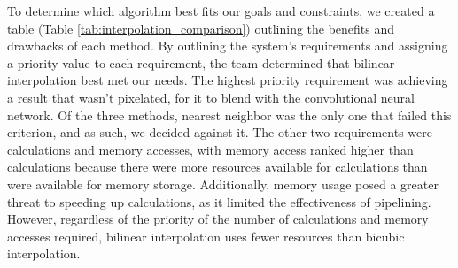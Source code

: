\documentclass{article}
\begin{document}
    \begin{table}[h]
    \centering
    \caption{A comparison between three upscaling methods based on three requirements relevant to the high-level upscaling structure.}
    \label{tab:interpolation_comparison}
    \end{table}


    \par To determine which algorithm best fits our goals and constraints, we created a table (Table \ref{tab:interpolation_comparison}) outlining the benefits and drawbacks of each method. By outlining the system's requirements and assigning a priority value to each requirement, the team determined that bilinear interpolation best met our needs. The highest priority requirement was achieving a result that wasn’t pixelated, for it to blend with the convolutional neural network. Of the three methods, nearest neighbor was the only one that failed this criterion, and as such, we decided against it. The other two requirements were calculations and memory accesses, with memory access ranked higher than calculations because there were more resources available for calculations than were available for memory storage. Additionally, memory usage posed a greater threat to speeding up calculations, as it limited the effectiveness of pipelining. However, regardless of the priority of the number of calculations and memory accesses required, bilinear interpolation uses fewer resources than bicubic interpolation.
\end{document}
